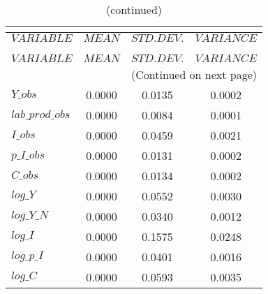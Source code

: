  
\begin{center}
\begin{longtable}{lccc} 
\caption{THEORETICAL MOMENTS}\\
 \label{Table:th_moments}\\
\toprule 
$VARIABLE        $	 & 	 $         MEAN$	 & 	 $    STD. DEV.$	 & 	 $     VARIANCE$\\
\midrule \endfirsthead 
\caption{(continued)}\\
 \toprule \\ 
$VARIABLE        $	 & 	 $         MEAN$	 & 	 $    STD. DEV.$	 & 	 $     VARIANCE$\\
\midrule \endhead 
\midrule \multicolumn{4}{r}{(Continued on next page)} \\ \bottomrule \endfoot 
\bottomrule \endlastfoot 
$Y\_obs          $	 & 	       0.0000	 & 	       0.0135	 & 	       0.0002 \\ 
$lab\_prod\_obs  $	 & 	       0.0000	 & 	       0.0084	 & 	       0.0001 \\ 
$I\_obs          $	 & 	       0.0000	 & 	       0.0459	 & 	       0.0021 \\ 
$p\_I\_obs       $	 & 	       0.0000	 & 	       0.0131	 & 	       0.0002 \\ 
$C\_obs          $	 & 	       0.0000	 & 	       0.0134	 & 	       0.0002 \\ 
$log\_Y          $	 & 	       0.0000	 & 	       0.0552	 & 	       0.0030 \\ 
$log\_Y\_N       $	 & 	       0.0000	 & 	       0.0340	 & 	       0.0012 \\ 
$log\_I          $	 & 	       0.0000	 & 	       0.1575	 & 	       0.0248 \\ 
$log\_p\_I       $	 & 	       0.0000	 & 	       0.0401	 & 	       0.0016 \\ 
$log\_C          $	 & 	       0.0000	 & 	       0.0593	 & 	       0.0035 \\ 
\end{longtable}
 \end{center}
